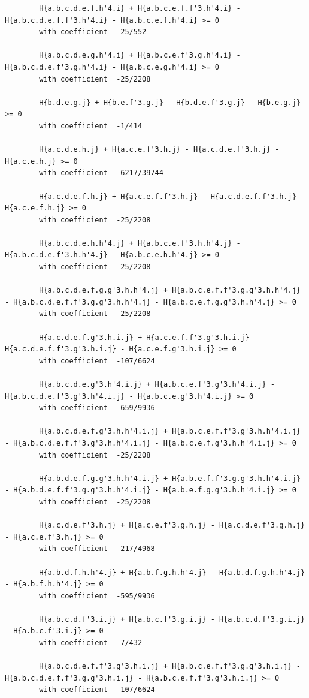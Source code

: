\documentclass[11pt, a4paper]{kybernetika}
\begin{document}
\begin{verbatim}
		H{a.b.c.d.e.f.h'4.i} + H{a.b.c.e.f.f'3.h'4.i} - H{a.b.c.d.e.f.f'3.h'4.i} - H{a.b.c.e.f.h'4.i} >= 0
		with coefficient  -25/552
		
		H{a.b.c.d.e.g.h'4.i} + H{a.b.c.e.f'3.g.h'4.i} - H{a.b.c.d.e.f'3.g.h'4.i} - H{a.b.c.e.g.h'4.i} >= 0
		with coefficient  -25/2208
		
		H{b.d.e.g.j} + H{b.e.f'3.g.j} - H{b.d.e.f'3.g.j} - H{b.e.g.j} >= 0
		with coefficient  -1/414
		
		H{a.c.d.e.h.j} + H{a.c.e.f'3.h.j} - H{a.c.d.e.f'3.h.j} - H{a.c.e.h.j} >= 0
		with coefficient  -6217/39744
		
		H{a.c.d.e.f.h.j} + H{a.c.e.f.f'3.h.j} - H{a.c.d.e.f.f'3.h.j} - H{a.c.e.f.h.j} >= 0
		with coefficient  -25/2208
		
		H{a.b.c.d.e.h.h'4.j} + H{a.b.c.e.f'3.h.h'4.j} - H{a.b.c.d.e.f'3.h.h'4.j} - H{a.b.c.e.h.h'4.j} >= 0
		with coefficient  -25/2208
		
		H{a.b.c.d.e.f.g.g'3.h.h'4.j} + H{a.b.c.e.f.f'3.g.g'3.h.h'4.j} - H{a.b.c.d.e.f.f'3.g.g'3.h.h'4.j} - H{a.b.c.e.f.g.g'3.h.h'4.j} >= 0
		with coefficient  -25/2208
		
		H{a.c.d.e.f.g'3.h.i.j} + H{a.c.e.f.f'3.g'3.h.i.j} - H{a.c.d.e.f.f'3.g'3.h.i.j} - H{a.c.e.f.g'3.h.i.j} >= 0
		with coefficient  -107/6624
		
		H{a.b.c.d.e.g'3.h'4.i.j} + H{a.b.c.e.f'3.g'3.h'4.i.j} - H{a.b.c.d.e.f'3.g'3.h'4.i.j} - H{a.b.c.e.g'3.h'4.i.j} >= 0
		with coefficient  -659/9936
		
		H{a.b.c.d.e.f.g'3.h.h'4.i.j} + H{a.b.c.e.f.f'3.g'3.h.h'4.i.j} - H{a.b.c.d.e.f.f'3.g'3.h.h'4.i.j} - H{a.b.c.e.f.g'3.h.h'4.i.j} >= 0
		with coefficient  -25/2208
		
		H{a.b.d.e.f.g.g'3.h.h'4.i.j} + H{a.b.e.f.f'3.g.g'3.h.h'4.i.j} - H{a.b.d.e.f.f'3.g.g'3.h.h'4.i.j} - H{a.b.e.f.g.g'3.h.h'4.i.j} >= 0
		with coefficient  -25/2208
		
		H{a.c.d.e.f'3.h.j} + H{a.c.e.f'3.g.h.j} - H{a.c.d.e.f'3.g.h.j} - H{a.c.e.f'3.h.j} >= 0
		with coefficient  -217/4968
		
		H{a.b.d.f.h.h'4.j} + H{a.b.f.g.h.h'4.j} - H{a.b.d.f.g.h.h'4.j} - H{a.b.f.h.h'4.j} >= 0
		with coefficient  -595/9936
		
		H{a.b.c.d.f'3.i.j} + H{a.b.c.f'3.g.i.j} - H{a.b.c.d.f'3.g.i.j} - H{a.b.c.f'3.i.j} >= 0
		with coefficient  -7/432
		
		H{a.b.c.d.e.f.f'3.g'3.h.i.j} + H{a.b.c.e.f.f'3.g.g'3.h.i.j} - H{a.b.c.d.e.f.f'3.g.g'3.h.i.j} - H{a.b.c.e.f.f'3.g'3.h.i.j} >= 0
		with coefficient  -107/6624
		

\end{verbatim}
\end{document}
